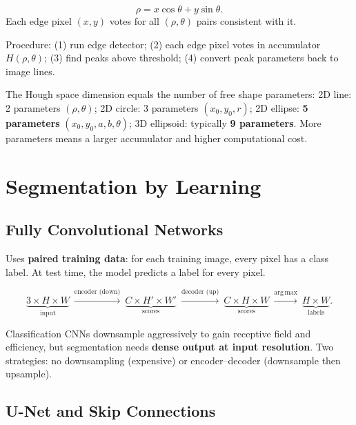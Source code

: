 \documentclass[11pt, oneside]{book}
\newcommand{\argmax}{\operatorname*{arg\,max}}
\begin{document}
\begin{thmbox}[title={Line Parameterization}]
\[
\rho = x\cos\theta + y\sin\theta.
\]
Each edge pixel $(x,y)$ votes for all $(\rho,\theta)$ pairs consistent with it.
\end{thmbox}

Procedure: (1) run edge detector; (2) each edge pixel votes in accumulator $H(\rho,\theta)$;
(3) find peaks above threshold; (4) convert peak parameters back to image lines.

The Hough space dimension equals the number of free shape parameters:
2D line: 2 parameters $(\rho,\theta)$; 2D circle: 3 parameters $(x_0,y_0,r)$;
2D ellipse: \textbf{5 parameters} $(x_0,y_0,a,b,\theta)$; 3D ellipsoid: typically \textbf{9 parameters}.
More parameters means a larger accumulator and higher computational cost.

\section{Segmentation by Learning}

\subsection{Fully Convolutional Networks}

\begin{defbox}[title={Learning-Based Semantic Segmentation}]
Uses \textbf{paired training data}: for each training image, every pixel has a class label.
At test time, the model predicts a label for every pixel.
\end{defbox}

\begin{thmbox}[title={FCN Score-Tensor View}]
\[
\underbrace{3\times H\times W}_{\text{input}}
\ \xrightarrow{\text{encoder (down)}}\
\underbrace{C\times H'\times W'}_{\text{scores}}
\ \xrightarrow{\text{decoder (up)}}\
\underbrace{C\times H\times W}_{\text{scores}}
\ \xrightarrow{\argmax}\
\underbrace{H\times W}_{\text{labels}}.
\]
\end{thmbox}

Classification CNNs downsample aggressively to gain receptive field and efficiency,
but segmentation needs \textbf{dense output at input resolution}. Two strategies:
no downsampling (expensive) or encoder--decoder (downsample then upsample).

\subsection{U-Net and Skip Connections}
\end{document}
